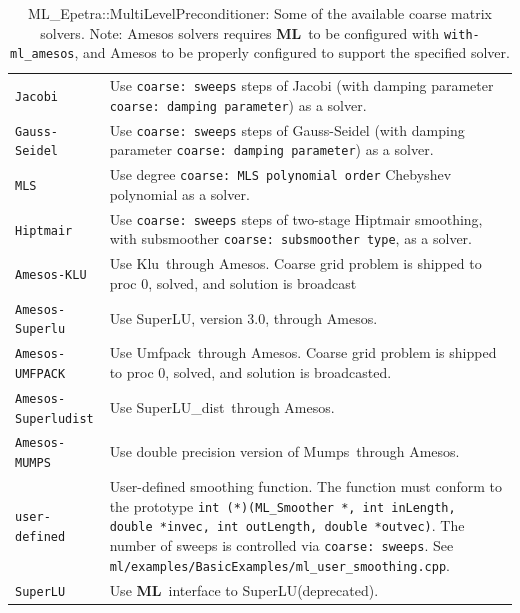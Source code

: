 \documentclass{article}[11pt]
\newcommand{\ML}     {{\bf ML}}
\newcommand{\amesos}  {{\sc Amesos}}
\newcommand{\umfpack}  {{\sc Umfpack}}
\newcommand{\superlu}  {{\sc SuperLU}}
\newcommand{\superludist}  {{\sc SuperLU\_dist}}
\newcommand{\mumps}  {{\sc Mumps}}
\newcommand{\klu}  {{\sc Klu}}
\begin{document}
\begin{table}[tbh]
\begin{center}
\begin{tabular}{ | p{4cm} | p{10cm} | }
\hline
\verb!Jacobi! & Use {\tt coarse: sweeps} steps of Jacobi (with damping
parameter {\tt coarse: damping parameter}) as a solver. \\
\verb!Gauss-Seidel! & Use  {\tt coarse: sweeps} steps of Gauss-Seidel (with damping
parameter {\tt coarse: damping parameter}) as a solver. \\ 
\verb!MLS! & Use degree {\tt coarse: MLS polynomial order} Chebyshev polynomial
             as a solver. \\
\verb!Hiptmair! & Use {\tt coarse: sweeps} steps of two-stage Hiptmair
             smoothing, with subsmoother {\tt coarse: subsmoother type},
             as a solver. \\
\verb!Amesos-KLU! & Use \klu\ through \amesos. Coarse grid problem is shipped to
 proc 0, solved, and solution is broadcast \\
\verb!Amesos-Superlu! & Use \superlu, version $3.0$, through \amesos. \\
\verb!Amesos-UMFPACK! & Use \umfpack\ through \amesos. Coarse grid problem is shipped to
 proc 0, solved, and solution is broadcasted. \\
\verb!Amesos-Superludist! & Use \superludist\ through \amesos. \\
\verb!Amesos-MUMPS! & Use double precision version of \mumps~through
\amesos. \\
\verb!user-defined! & User-defined smoothing function.  The function must conform to
the prototype {\tt int (*)(ML\_Smoother *, int inLength, double *invec, int outLength,
 double *outvec)}. The number of sweeps is controlled via {\tt coarse: sweeps}. See
{\tt ml/examples/BasicExamples/ml\_user\_smoothing.cpp}.\\
\verb!SuperLU! & Use \ML\ interface to \superlu (deprecated). \\
\hline
\end{tabular}
\caption{ML\_Epetra::MultiLevelPreconditioner: Some of the available coarse
matrix solvers. Note: Amesos solvers requires 
  \ML\ to be configured with {\tt with-ml\_amesos}, and Amesos to be
  properly configured to support the specified solver.}
\label{tab:ml:coarse}
\end{center}
\end{table}
%
\end{document}
